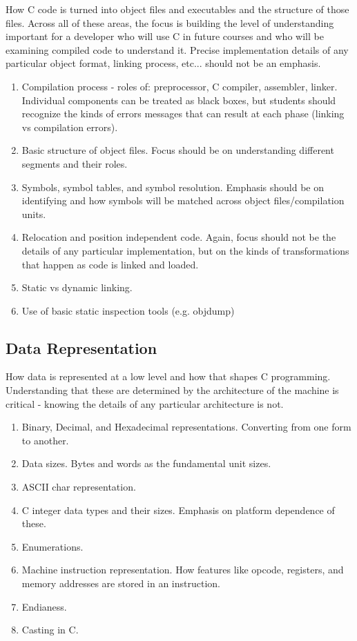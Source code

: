 \documentclass[12pt,letterpaper]{article}
\begin{document}
	How C code is turned into object files and executables and the structure of those files. Across all of these areas, the focus is building the level of understanding important for a developer who will use C in future courses and who will be examining compiled code to understand it. Precise implementation details of any particular object format, linking process, etc... should not be an emphasis.

	\begin{enumerate}
		\item Compilation process - roles of: preprocessor, C compiler, assembler, linker. Individual components can be treated as black boxes, but students should recognize the kinds of errors messages that can result at each phase (linking vs compilation errors). 
		\item Basic structure of object files. Focus should be on understanding different segments and their roles.
		\item Symbols, symbol tables, and symbol resolution.  Emphasis should be on identifying and how symbols will be matched across object files/compilation units. 
		\item Relocation and position independent code. Again, focus should not be the details of any particular implementation, but on the kinds of transformations that happen as code is linked and loaded.
		\item Static vs dynamic linking. 
		\item Use of basic static inspection tools (e.g. objdump)
	\end{enumerate}
	

	\subsection{Data Representation}

	How data is represented at a low level and how that shapes C programming. Understanding that these are determined by the architecture of the machine is critical - knowing the details of any particular architecture is not.

	\begin{enumerate}
		\item Binary, Decimal, and Hexadecimal representations. Converting from one form to another.
		\item Data sizes. Bytes and words as the fundamental unit sizes. 
		\item ASCII char representation.
		\item C integer data types and their sizes. Emphasis on platform dependence of these. 
		\item Enumerations.
		\item Machine instruction representation. How features like opcode, registers, and memory addresses are stored in an instruction.
		\item Endianess.
		\item Casting in C.
	\end{enumerate}
\end{document}
